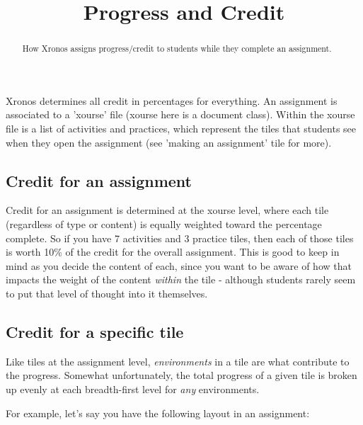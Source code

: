 \documentclass{ximera}
\title{Progress and Credit}
\begin{document}
\begin{abstract}
    How Xronos assigns progress/credit to students while they complete an assignment.
\end{abstract}
\maketitle

    Xronos determines all credit in percentages for everything. An assignment is associated to a 'xourse' file (xourse here is a document class). Within the xourse file is a list of activities and practices, which represent the tiles that students see when they open the assignment (see 'making an assignment' tile for more).
    
    \subsection*{Credit for an assignment}
        Credit for an assignment is determined at the xourse level, where each tile (regardless of type or content) is equally weighted toward the percentage complete. So if you have 7 activities and 3 practice tiles, then each of those tiles is worth 10\% of the credit for the overall assignment. This is good to keep in mind as you decide the content of each, since you want to be aware of how that impacts the weight of the content \textit{within} the tile - although students rarely seem to put that level of thought into it themselves.
        
    \subsection*{Credit for a specific tile}
        Like tiles at the assignment level, \textit{environments} in a tile are what contribute to the progress. Somewhat unfortunately, the total progress of a given tile is broken up evenly at each breadth-first level for \textit{any} environments. 
        
        For example, let's say you have the following layout in an assignment:
        
\end{document}
